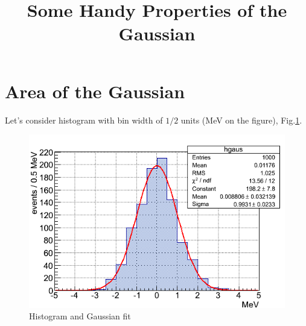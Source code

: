 \documentclass[english]{article}
\makeatletter
\def\ScaleIfNeeded{%
\ifdim\Gin@nat@width>\linewidth
\linewidth
\else
\Gin@nat@width
\fi
}
\makeatother
\begin{document}
\title{Some Handy Properties of the Gaussian}

\maketitle

\section{Area of the Gaussian}

Let's consider histogram with bin width of $1/2$ units (MeV on the figure), Fig.\ref{fig:hgaus}.

\begin{figure}[h]
\centering
\begin{minipage}[t]{1.0 \linewidth}
\includegraphics[width=\ScaleIfNeeded]{latex_template_pic}
\caption{Histogram and Gaussian fit}
\label{fig:hgaus}
\end{minipage}
\end{figure}
\end{document}
